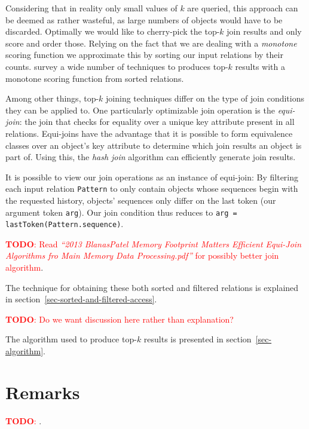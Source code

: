 \documentclass[11pt,a4paper]{report}
\newcommand{\inlinecode}[1]{\lstinline[columns=fixed]{#1}}
\newcommand{\todo}[1]{\textcolor{red}{\textbf{TODO}: #1}}
\begin{document}
Considering that in reality only small values of $k$ are queried, this approach
can be deemed as rather wasteful, as large numbers of objects would have to be
discarded.
Optimally we would like to cherry-pick the top-$k$ join results and only
score and order those.
Relying on the fact that we are dealing with a \emph{monotone} scoring function
we approximate this by sorting our input relations by their counts.
\cite{Ilyas2008} survey a wide number of techniques to produces top-$k$ results
with a monotone scoring function from sorted relations.

Among other things, top-$k$ joining techniques differ on the type of join
conditions they can be applied to.
One particularly optimizable join operation is the \emph{equi-join}:
the join that checks for equality over a unique key attribute present in all
relations.
Equi-joins have the advantage that it is possible to form equivalence classes
over an object's key attribute to determine which join results an object is
part of.
Using this, the \emph{hash join} algorithm can efficiently generate join
results.

It is possible to view our join operations as an instance of equi-join:
By filtering each input relation \inlinecode{Pattern} to only contain
objects whose sequences begin with the requested history, objects'
sequences only differ on the last token (our argument token \inlinecode{arg}).
Our join condition thus reduces to
\inlinecode{arg = lastToken(Pattern.sequence)}.

\todo{Read \textit{``2013 BlanasPatel Memory Footprint Matters Efficient
Equi-Join Algorithms fro Main Memory Data Processing.pdf''} for possibly better
join algorithm}.

The technique for obtaining these both sorted and filtered relations is
explained in section~\ref{sec-sorted-and-filtered-access}.

\todo{Do we want discussion here rather than explanation?}

The algorithm used to produce top-$k$ results is presented in
section~\ref{sec-algorithm}.

\section{Remarks}

\todo{}.

\end{document}
